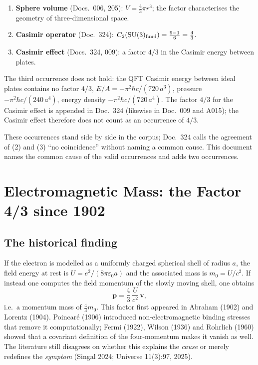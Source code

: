 \begin{enumerate}
\item \textbf{Sphere volume} (Docs.~006, 205): $V = \tfrac{4}{3}\pi r^3$; the
  factor characterises the geometry of three-dimensional space.
\item \textbf{Casimir operator} (Doc.~324): $C_2(\mathrm{SU}(3)_{\rm fund})
  = \tfrac{9-1}{6} = \tfrac{4}{3}$.
\item \textbf{Casimir effect} (Docs.~324, 009): a factor $4/3$ in
  the Casimir energy between plates.
\end{enumerate}
The third occurrence does not hold: the QFT Casimir energy between ideal plates
contains no factor $4/3$, $E/A = -\pi^2\hbar c/(720\,a^3)$, pressure
$-\pi^2\hbar c/(240\,a^4)$, energy density $-\pi^2\hbar c/(720\,a^4)$. The
factor $4/3$ for the Casimir effect is appended in Doc.~324 (likewise in
Doc.~009 and A015); the Casimir effect therefore does not count as an
occurrence of $4/3$.

These occurrences stand side by side in the corpus; Doc.~324 calls the
agreement of (2) and (3) ``no coincidence'' without naming a common cause.
This document names the common cause of the valid occurrences and adds two
occurrences.

\section{Electromagnetic Mass: the Factor 4/3 since 1902}
\label{sec:em}

\subsection{The historical finding \EM}

If the electron is modelled as a uniformly charged spherical shell of radius
$a$, the field energy at rest is $U = e^2/(8\pi\varepsilon_0 a)$ and the
associated mass is $m_0 = U/c^2$. If instead one computes the field momentum of
the slowly moving shell, one obtains
\begin{equation}
  \mathbf p = \frac{4}{3}\,\frac{U}{c^2}\,\mathbf v ,
  \label{eq:p43}
\end{equation}
i.e.\ a momentum mass of $\tfrac{4}{3}m_0$. This factor first appeared in
Abraham (1902) and Lorentz (1904). Poincaré (1906) introduced non-electromagnetic
binding stresses that remove it computationally; Fermi (1922), Wilson (1936) and
Rohrlich (1960) showed that a covariant definition of the four-momentum makes it
vanish as well. The literature still disagrees on whether this explains the
\emph{cause} or merely redefines the \emph{symptom} (Singal 2024; Universe
11(3):97, 2025).

